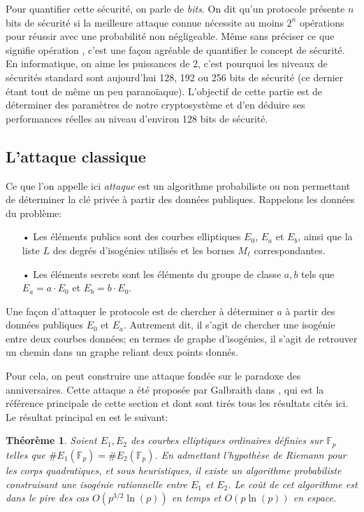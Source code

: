 \documentclass[11pt,a4paper]{article}
\newcommand{\F}{\mathbb{F}}
\renewcommand{\v}{\vspace{5mm}}
\newtheorem*{thm}{Théorème}
\theoremstyle{definition}
\begin{document}
\v
Pour quantifier cette sécurité, on parle de \emph{bits}. On dit qu'un protocole présente $n$ bits de sécurité si la meilleure attaque connue nécessite au moins $2^n$ opérations pour réussir avec une probabilité non négligeable. Même sans préciser ce que signifie \og opération \fg, c'est une façon agréable de quantifier le concept de sécurité. En informatique, on aime les puissances de 2, c'est pourquoi les niveaux de sécurités standard sont aujourd'hui 128, 192 ou 256 bits de sécurité (ce dernier étant tout de même un peu paranoïaque). L'objectif de cette partie est de déterminer des paramètres de notre cryptosystème et d'en déduire ses performances réelles au niveau d'environ 128 bits de sécurité.


\subsection{L'attaque classique}

Ce que l'on appelle ici \emph{attaque} est un algorithme probabiliste ou non permettant de déterminer la clé privée à partir des données publiques. Rappelons les données du problème:
\begin{itemize}
\item[•] Les éléments publics sont des courbes elliptiques $E_0$, $E_a$ et $E_b$, ainsi que la liste $L$ des degrés d'isogénies utilisés et les bornes $M_\ell$ correspondantes.
\item[•] Les éléments secrets sont les éléments du groupe de classe $a, b$ tels que $E_a = a\cdot E_0$ et $E_b = b\cdot E_0$.
\end{itemize}

Une façon d'attaquer le protocole est de chercher à déterminer $a$ à partir des données publiques $E_0$ et $E_a$. Autrement dit, il s'agit de chercher une isogénie entre deux courbes données; en termes de graphe d'isogénies, il s'agit de retrouver un chemin dans un graphe reliant deux points donnés.

\v
Pour cela, on peut construire une attaque fondée sur le \og paradoxe des anniversaires\fg. Cette attaque a été proposée par Galbraith dans \cite{Galbraith}, qui est la référence principale de cette section et dont sont tirés tous les résultats cités ici. Le résultat principal en est le suivant:

\begin{thm}
Soient $E_1, E_2$ des courbes elliptiques ordinaires définies sur $\F_p$ telles que $\#E_1(\F_p) = \#E_2(\F_p)$. En admettant l'hypothèse de Riemann pour les corps quadratiques, et sous heuristiques, il existe un algorithme probabiliste construisant une isogénie rationnelle entre $E_1$ et $E_2$. Le coût de cet algorithme est dans le pire des cas $O(p^{3/2}\ln(p))$ en temps et $O(p \ln(p))$ en espace.
\end{thm}
\end{document}
